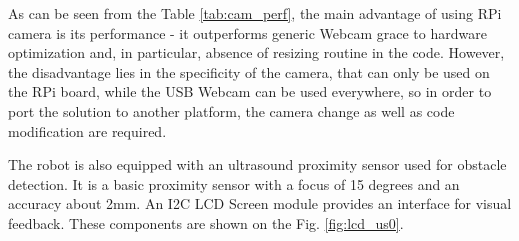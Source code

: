 As can be seen from the Table \ref{tab:cam_perf}, the main advantage of using
RPi camera is its performance - it outperforms generic Webcam grace to hardware
optimization and, in particular, absence of resizing routine in the code.
However, the disadvantage lies in the specificity of the camera, that can only
be used on the RPi board, while the USB Webcam can be used everywhere, so in
order to port the solution to another platform, the camera change as well as
 code modification are required.

The robot is also equipped with an ultrasound proximity sensor used for obstacle
detection. It is a basic proximity sensor with a focus of 15 degrees and an
accuracy about 2mm. An I2C LCD Screen module provides an interface for visual feedback.
These components are shown on the Fig. \ref{fig:lcd_us0}.